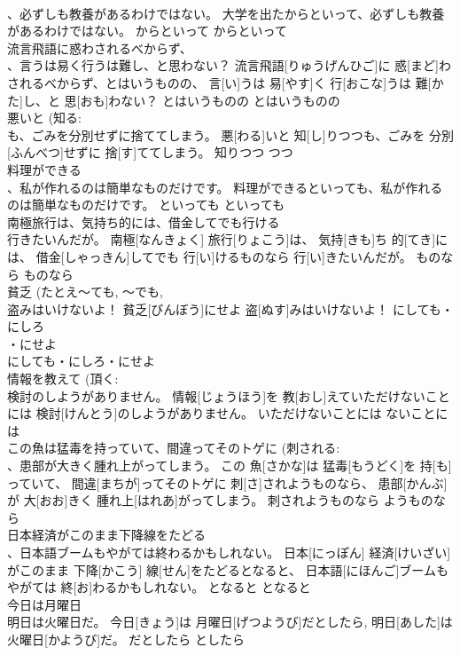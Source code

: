 \documentclass[8pt]{extreport}
\begin{document}
\begin{CJK}{UTF8}{min}
\\	、必ずしも教養があるわけではない。	大学を出たからといって、必ずしも教養があるわけではない。	からといって	からといって	
\\	流言飛語に惑わされるべからず、
\\	、言うは易く行うは難し、と思わない？	流言飛語[りゅうげんひご]に 惑[まど]わされるべからず、とはいうものの、 言[い]うは 易[やす]く 行[おこな]うは 難[かた]し、と 思[おも]わない？	とはいうものの	とはいうものの	
\\	悪いと (知る: 
\\	も、ごみを分別せずに捨ててしまう。	悪[わる]いと 知[し]りつつも、ごみを 分別[ふんべつ]せずに 捨[す]ててしまう。	知りつつ	つつ	
\\	料理ができる 
\\	、私が作れるのは簡単なものだけです。	料理ができるといっても、私が作れるのは簡単なものだけです。	といっても	といっても	
\\	南極旅行は、気持ち的には、借金してでも行ける 
\\	行きたいんだが。	南極[なんきょく] 旅行[りょこう]は、 気持[きも]ち 的[てき]には、 借金[しゃっきん]してでも 行[い]けるものなら 行[い]きたいんだが。	ものなら	ものなら	
\\	貧乏 (たとえ～ても, ～でも, 
\\	盗みはいけないよ！	貧乏[びんぼう]にせよ 盗[ぬす]みはいけないよ！	にしても・にしろ
\\	・にせよ
\\	にしても・にしろ・にせよ	
\\	情報を教えて (頂く: 
\\	検討のしようがありません。	情報[じょうほう]を 教[おし]えていただけないことには 検討[けんとう]のしようがありません。	いただけないことには	ないことには	
\\	この魚は猛毒を持っていて、間違ってそのトゲに (刺される: 
\\	、患部が大きく腫れ上がってしまう。	この 魚[さかな]は 猛毒[もうどく]を 持[も]っていて、 間違[まちが]ってそのトゲに 刺[さ]されようものなら、 患部[かんぶ]が 大[おお]きく 腫れ上[はれあ]がってしまう。	刺されようものなら	ようものなら	
\\	日本経済がこのまま下降線をたどる 
\\	、日本語ブームもやがては終わるかもしれない。	日本[にっぽん] 経済[けいざい]がこのまま 下降[かこう] 線[せん]をたどるとなると、 日本語[にほんご]ブームもやがては 終[お]わるかもしれない。	となると	となると	
\\	今日は月曜日 
\\	明日は火曜日だ。	今日[きょう]は 月曜日[げつようび]だとしたら, 明日[あした]は 火曜日[かようび]だ。	だとしたら	としたら	

\end{CJK}
\end{document}
